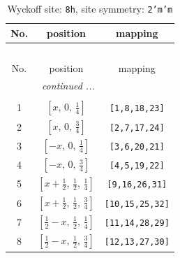 \documentclass[fleqn,8pt]{jsarticle}
\begin{document}
\begin{longtable}{ccc}
\caption{Wyckoff site: {\tt 8h}, site symmetry: {\tt 2'm'm}}
 \\
 \hline \hline
No. & position & mapping \\ \hline \endfirsthead

\multicolumn{2}{l}{\tablename\ \thetable{}} \\
 \hline \hline
No. & position & mapping \\ \hline \endhead

 \hline \hline
\multicolumn{2}{r}{\footnotesize\it continued ...} \\ \endfoot

 \hline \hline
\multicolumn{2}{r}{} \\ \endlastfoot

1 & $\left[ x,\, 0,\, \frac{1}{4} \right]$ & {\tt [1,8,18,23]} \\ \hline
2 & $\left[ x,\, 0,\, \frac{3}{4} \right]$ & {\tt [2,7,17,24]} \\ \hline
3 & $\left[ - x,\, 0,\, \frac{1}{4} \right]$ & {\tt [3,6,20,21]} \\ \hline
4 & $\left[ - x,\, 0,\, \frac{3}{4} \right]$ & {\tt [4,5,19,22]} \\ \hline
5 & $\left[ x + \frac{1}{2},\, \frac{1}{2},\, \frac{1}{4} \right]$ & {\tt [9,16,26,31]} \\ \hline
6 & $\left[ x + \frac{1}{2},\, \frac{1}{2},\, \frac{3}{4} \right]$ & {\tt [10,15,25,32]} \\ \hline
7 & $\left[ \frac{1}{2} - x,\, \frac{1}{2},\, \frac{1}{4} \right]$ & {\tt [11,14,28,29]} \\ \hline
8 & $\left[ \frac{1}{2} - x,\, \frac{1}{2},\, \frac{3}{4} \right]$ & {\tt [12,13,27,30]} \\
\end{longtable}
\renewcommand{\arraystretch}{1.2}
\end{document}
